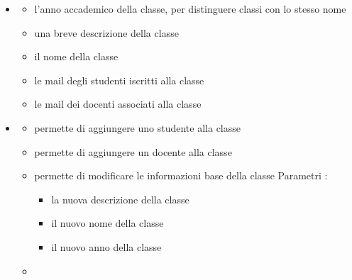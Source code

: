 \begin{itemize}
\item {}
\begin{itemize}
\item {}
\newline
l'anno accademico della classe, per distinguere classi con lo stesso nome
\item {}
\newline
una breve descrizione della classe
\item {}
\newline
il nome della classe
\item {}
\newline
le mail degli studenti iscritti alla classe
\item {}
\newline
le mail dei docenti associati alla classe
\end{itemize}
\item {}
\begin{itemize}
\item {}
\newline
permette di aggiungere uno studente alla classe
\newline
\item {}
\newline
permette di aggiungere un docente alla classe
\newline
\item {}
\newline
permette
di modificare le informazioni base della classe
\newline
Parametri :
\begin{itemize}
\item {}
\newline
la nuova descrizione della classe
\item {}
\newline
il nuovo nome della classe
\item {}
\newline
il nuovo anno della classe
\end{itemize}
\item {}
\newline

\end{itemize}
\end{itemize}
